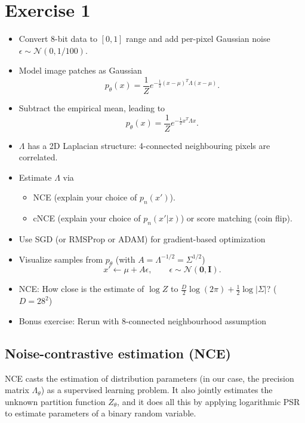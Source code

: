 \documentclass[a4paper]{article}
\begin{document}
\section*{Exercise 1}

\begin{itemize}
\item Convert 8-bit data to $[0,1]$ range and add per-pixel Gaussian noise $\epsilon \sim \mathcal{N}(0, 1/100)$.
\item Model image patches as Gaussian
$$p_\theta(x) = \frac{1}{Z}e^{-\frac{1}{2}(x-\mu)^T \Lambda (x-\mu)}.$$
\item Subtract the empirical mean, leading to
$$p_\theta(x) = \frac{1}{Z} e^{-\frac{1}{2}x^T\Lambda x}.$$
\item $\Lambda$ has a 2D Laplacian structure: 4-connected neighbouring pixels are correlated.
\item Estimate $\Lambda$ via
\begin{itemize}
\item NCE (explain your choice of $p_n(x')$).
\item cNCE (explain your choice of $p_n(x'|x)$) or score matching (coin flip).
\end{itemize}

\item Use SGD (or RMSProp or ADAM) for gradient-based optimization

\item Visualize samples from $p_\theta$ (with $A = \Lambda^{-1/2} = \Sigma^{1/2}$)
$$x' \leftarrow \mu + A \epsilon, \qquad \epsilon \sim \mathcal{N}(\boldsymbol{0},\mathbf{I}).$$

\item NCE: How close is the estimate of $\log Z$ to $\frac{D}{2}\log(2\pi) + \frac{1}{2}\log|\Sigma|$? ($D = 28^2$)
\item Bonus exercise: Rerun with 8-connected neighbourhood assumption
\end{itemize}

\subsection*{Noise-contrastive estimation (NCE)}

NCE casts the estimation of distribution parameters (in our case, the precision matrix $\Lambda_\theta$) as a supervised learning problem. It also jointly estimates the unknown partition function $Z_\theta$, and it does all this by applying logarithmic PSR to estimate parameters of a binary random variable. 
\end{document}
